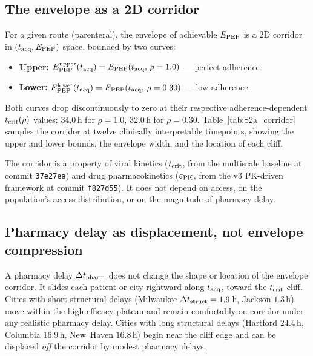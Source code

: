 \documentclass[11pt]{article}
\theoremstyle{definition}
\theoremstyle{remark}
\begin{document}
\subsection{The envelope as a 2D corridor}
\label{sec:S2_corridor}

For a given route (parenteral), the envelope of achievable $E_{\rm PEP}$ is
a 2D corridor in $(t_{\rm acq}, E_{\rm PEP})$ space, bounded by two curves:
\begin{itemize}
  \item \textbf{Upper:} $E_{\rm PEP}^{\rm upper}(t_{\rm acq}) =
    E_{\rm PEP}(t_{\rm acq},\, \rho=1.0)$ --- perfect adherence
  \item \textbf{Lower:} $E_{\rm PEP}^{\rm lower}(t_{\rm acq}) =
    E_{\rm PEP}(t_{\rm acq},\, \rho=0.30)$ --- low adherence
\end{itemize}
Both curves drop discontinuously to zero at their respective
adherence-dependent $t_{\rm crit}(\rho)$ values: $34.0$\,h for $\rho=1.0$,
$32.0$\,h for $\rho=0.30$.  Table~\ref{tab:S2a_corridor} samples the
corridor at twelve clinically interpretable timepoints, showing the
upper and lower bounds, the envelope width, and the location of each
cliff.



The corridor is a property of viral kinetics
($t_{\rm crit}$, from the multiscale baseline at commit \texttt{37e27ea})
and drug pharmacokinetics ($\varepsilon_{\rm PK}$, from the v3 PK-driven
framework at commit \texttt{f827d55}).  It does not depend on access, on
the population's access distribution, or on the magnitude of pharmacy
delay.

\subsection{Pharmacy delay as displacement, not envelope compression}
\label{sec:S2_displacement}

A pharmacy delay $\Delta t_{\rm pharm}$ does not change the shape or
location of the envelope corridor.  It slides each patient or city
rightward along $t_{\rm acq}$, toward the $t_{\rm crit}$ cliff.  Cities
with short structural delays
(Milwaukee $\Delta t_{\rm struct} = 1.9$\,h, Jackson $1.3$\,h) move within
the high-efficacy plateau and remain comfortably on-corridor under any
realistic pharmacy delay.  Cities with long structural delays
(Hartford $24.4$\,h, Columbia $16.9$\,h, New~Haven $16.8$\,h) begin near
the cliff edge and can be displaced \emph{off} the corridor by modest
pharmacy delays.
\end{document}
